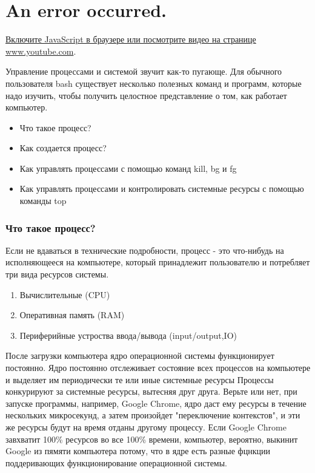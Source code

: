 \documentclass{report}
\begin{document}
\hypertarget{player}{}

\hypertarget{an-error-occurred.}{%
\section{An error occurred.}\label{an-error-occurred.}}

\href{https://www.youtube.com/watch?v=lfN2RE8720E}{Включите JavaScript в
браузере или посмотрите видео на странице www.youtube.com}.

Управление процессами и системой звучит как-то пугающе. Для обычного
пользователя bash существует несколько полезных команд и программ,
которые надо изучить, чтобы получить целостное представление о том, как
работает компьютер.

\begin{itemize}
\tightlist
\item
  Что такое процесс?
\item
  Как создается процесс?
\item
  Как управлять процессами с помощью команд kill, bg и fg
\item
  Как управлять процессами и контролировать системные ресурсы с помощью
  команды top
\end{itemize}

\hypertarget{What-is-a-Process}{%
\subsubsection{\texorpdfstring{\protect\hyperlink{What-is-a-Process}{}Что
такое процесс?}{Что такое процесс?}}\label{What-is-a-Process}}

Если не вдаваться в технические подробности, процесс - это что-нибудь на
исполняющееся на компьютере, который принадлежит пользователю и
потребляет три вида ресурсов системы.

\begin{enumerate}
\tightlist
\item
  Вычислительные (CPU)
\item
  Оперативная память (RAM)
\item
  Периферийные устроства ввода/вывода (input/output,IO)
\end{enumerate}

После загрузки компьютера ядро операционной системы функционирует
постоянно. Ядро постоянно отслеживает состояние всех процессов на
компьютере и выделяет им периодически те или иные системные ресурсы
Процессы конкурируют за системные ресурсы, вытесняя друг друга. Верьте
или нет, при запуске программы, например, Google Chrome, ядро даст ему
ресурсы в течение нескольких микросекунд, а затем произойдет
"переключение контекстов", и эти же ресурсы будут на время отданы
другому процессу. Если Google Chrome завхватит 100\% ресурсов во все
100\% времени, компьютер, вероятно, выкинит Google из пямяти компьютера
потому, что в ядре есть разные фцнкции поддеривающих функционирование
операционной системы.
\end{document}
